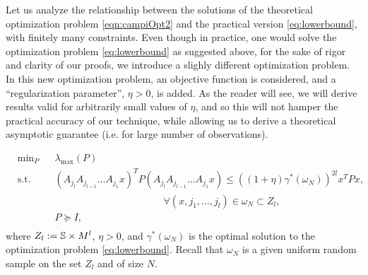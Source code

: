 Let us analyze the relationship between the solutions of the theoretical optimization problem \eqref{eqn:campiOpt2} and the practical version \eqref{eq:lowerbound}, with finitely many constraints. Even though in practice, one would solve the optimization problem  \eqref{eq:lowerbound} as suggested above, for the sake of rigor and clarity of our proofs, we introduce a slighly different optimization problem. In this new optimization problem, an objective function is considered, and a ``regularization parameter'', $\eta > 0$, is added. As the reader will see, we will derive results valid for arbitrarily small values of $\eta$, and so this will not hamper the practical accuracy of our technique, while allowing us to derive a theoretical asymptotic guarantee (i.e. for large number of observations).

\begin{equation}\label{eqn:campiOpt03}
\begin{aligned}
& \text{min}_{P} & & \lambda_{\max}(P) \\
& \text{s.t.} 
&  & (A_{j_l} A_{j_{l-1}} \dots A_{j_1} x)^T P (A_{j_l} A_{j_{l-1}} \dots A_{j_1} x) \leq {((1 +\eta)\gamma^*(\omega_N))}^{2l} x^T P x,\\
&&&\qquad \qquad \qquad \qquad \quad \qquad \forall (x, j_{1},\dots, j_{l}) \in \omega_N \subset Z_l, \\
& && P \succeq I, \\
\end{aligned}
\end{equation}
where $Z_l:= \mathbb{S} \times M^l$, $\eta > 0$, and $\gamma^*(\omega_N)$ is the optimal solution to the optimization problem \eqref{eq:lowerbound}. Recall that $\omega_N$ is a given uniform random sample on the set $Z_l$ and of size $N$. 

